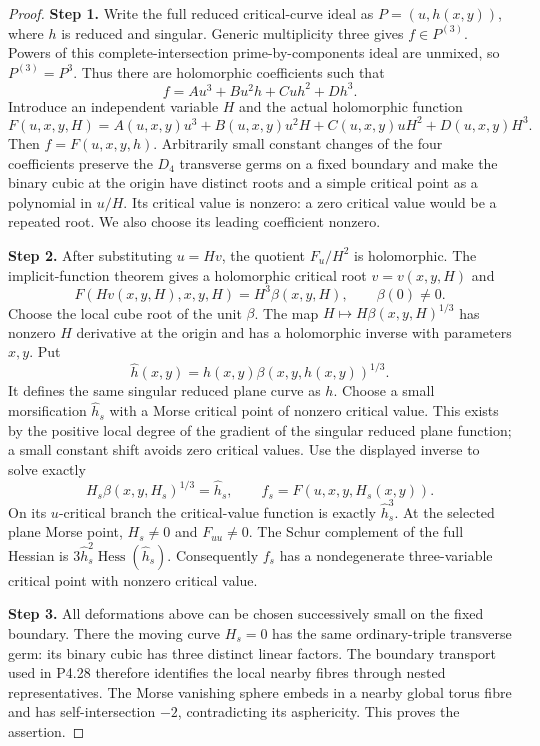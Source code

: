 \begin{proof}
\noindent\textbf{Step 1.} Write the full reduced critical-curve ideal as
$P=(u,h(x,y))$, where $h$ is reduced and singular.
Generic multiplicity three gives $f\in P^{(3)}$.
Powers of this complete-intersection prime-by-components
ideal are unmixed, so $P^{(3)}=P^3$. Thus there are
holomorphic coefficients such that
\[
 f=A u^3+B u^2h+Cuh^2+Dh^3.
\]
Introduce an independent variable $H$ and the actual
holomorphic function
\[
 F(u,x,y,H)=A(u,x,y)u^3+B(u,x,y)u^2H
               +C(u,x,y)uH^2+D(u,x,y)H^3.
\]
Then $f=F(u,x,y,h)$. Arbitrarily small constant changes
of the four coefficients preserve the $D_4$ transverse
germs on a fixed boundary and make the binary cubic
at the origin have distinct roots and a simple critical
point as a polynomial in $u/H$. Its critical value is
nonzero: a zero critical value would be a repeated root.
We also choose its leading coefficient nonzero.

\noindent\textbf{Step 2.} After substituting $u=Hv$, the quotient $F_u/H^2$
is holomorphic. The implicit-function theorem gives
a holomorphic critical root $v=v(x,y,H)$ and
\[
          F(Hv(x,y,H),x,y,H)=H^3\beta(x,y,H),
                       \qquad \beta(0)\ne0.
\]
Choose the local cube root of the unit $\beta$.
The map $H\mapsto H\beta(x,y,H)^{1/3}$ has nonzero
$H$ derivative at the origin and has a holomorphic
inverse with parameters $x,y$. Put
\[
             \widehat h(x,y)=h(x,y)
                           \beta(x,y,h(x,y))^{1/3}.
\]
It defines the same singular reduced plane curve as $h$.
Choose a small morsification $\widehat h_s$ with a
Morse critical point of nonzero critical value. This
exists by the positive local degree of the gradient
of the singular reduced plane function; a small constant
shift avoids zero critical values. Use the displayed
inverse to solve exactly
\[
         H_s\beta(x,y,H_s)^{1/3}=\widehat h_s,
             \qquad f_s=F(u,x,y,H_s(x,y)).
\]
On its $u$-critical branch the critical-value function
is exactly $\widehat h_s^3$. At the selected plane
Morse point, $H_s\ne0$ and $F_{uu}\ne0$. The Schur
complement of the full Hessian is
$3\widehat h_s^2\operatorname{Hess}(\widehat h_s)$.
Consequently $f_s$ has a nondegenerate three-variable
critical point with nonzero critical value.

\noindent\textbf{Step 3.} All deformations above can be chosen successively small
on the fixed boundary. There the moving curve $H_s=0$
has the same ordinary-triple transverse germ: its binary
cubic has three distinct linear factors. The boundary
transport used in P4.28 therefore identifies the local
nearby fibres through nested representatives. The Morse
vanishing sphere embeds in a nearby global torus fibre
and has self-intersection $-2$, contradicting its
asphericity. This proves the assertion.
\end{proof}

